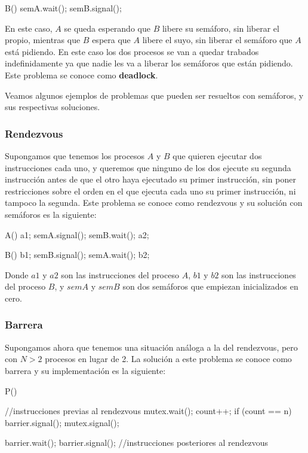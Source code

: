 \documentclass{article}
\begin{document}
\begin{code}
B()
{
    semA.wait();
		semB.signal();
}
\end{code}

En este caso, $A$ se queda esperando que $B$ libere su sem\'aforo, sin liberar el propio, mientras que $B$ espera que $A$ libere el suyo, sin liberar el sem\'aforo que $A$ est\'a pidiendo. En este caso los dos procesos se van a quedar trabados indefinidamente ya que nadie les va a liberar los sem\'aforos que est\'an pidiendo. Este problema se conoce como \textbf{deadlock}.

Veamos algunos ejemplos de problemas que pueden ser resueltos con sem\'aforos, y sus respectivas soluciones.

\subsubsection{Rendezvous}

Supongamos que tenemos los procesos $A$ y $B$ que quieren ejecutar dos instrucciones cada uno, y queremos que ninguno de los dos ejecute su segunda instrucci\'on antes de que el otro haya ejecutado su primer instrucci\'on, sin poner restricciones sobre el orden en el que ejecuta cada uno su primer instrucci\'on, ni tampoco la segunda. Este problema se conoce como rendezvous y su soluci\'on con sem\'aforos es la siguiente:

\begin{code}
A()
{
    a1;
		semA.signal();
		semB.wait();
		a2;
}

B()
{
    b1;
		semB.signal();
		semA.wait();
		b2;
}
\end{code}

Donde $a1$ y $a2$ son las instrucciones del proceso $A$, $b1$ y $b2$ son las instrucciones del proceso $B$, y $semA$ y $semB$ son dos sem\'aforos que empiezan inicializados en cero.

\subsubsection{Barrera}

Supongamos ahora que tenemos una situaci\'on an\'aloga a la del rendezvous, pero con $N > 2$ procesos en lugar de 2. La soluci\'on a este problema se conoce como barrera y su implementaci\'on es la siguiente:

\begin{code}
P()
{
    //instrucciones previas al rendezvous
    mutex.wait();
    count++;
    if (count == n)
        barrier.signal();
    mutex.signal();
    
    barrier.wait();
    barrier.signal();
    //instrucciones posteriores al rendezvous
}
\end{code}
\end{document}

